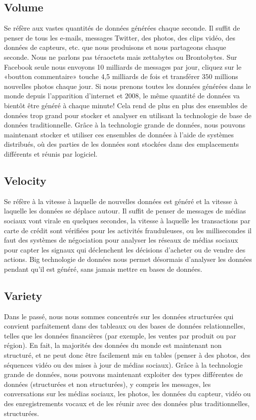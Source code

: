 \documentclass[11pt,twoside,openany,x11names,svgnames]{memoir}
\begin{document}
				\subsection{Volume}
				\normalsize Se réfère aux vastes quantités de données générées chaque seconde. Il suffit de penser de tous les e-mails, messages Twitter, des photos, des clips vidéo, des données de capteurs, etc. que nous produisons et nous partageons chaque seconde. Nous ne parlons pas téraoctets mais zettabytes ou Brontobytes. Sur Facebook seule nous envoyons 10 milliards de messages par jour, cliquez sur le «boutton commentaire» touche 4,5 milliards de fois et transférer $350$ millions nouvelles photos chaque jour. Si nous prenons toutes les données générées dans le monde depuis l'apparition d'internet et $2008$, le même quantité de données va bientôt être généré à chaque minute! Cela rend de plus en plus des ensembles de données trop grand pour stocker et analyser en utilisant la technologie de base de données traditionnelle. Grâce à la technologie grande de données, nous pouvons maintenant stocker et utiliser ces ensembles de données à l'aide de systèmes distribués, où des parties de les données sont stockées dans des emplacements différents et réunis par logiciel.
				\subsection{Velocity}
				\normalsize Se réfère à la vitesse à laquelle de nouvelles données est généré et la vitesse à laquelle les données se déplace autour. Il suffit de penser de messages de médias sociaux vont virale en quelques secondes, la vitesse à laquelle les transactions par carte de crédit sont vérifiées pour les activités frauduleuses, ou les millisecondes il faut des systèmes de négociation pour analyser les réseaux de médias sociaux pour capter les signaux qui déclenchent les décisions d'acheter ou de vendre des actions. Big technologie de données nous permet désormais d'analyser les données pendant qu'il est généré, sans jamais mettre en bases de données.
				\subsection{Variety}
				 \normalsize Dans le passé, nous nous sommes concentrés sur les données structurées qui convient parfaitement dans des tableaux ou des bases de données relationnelles, telles que les données financières (par exemple, les ventes par produit ou par région). En fait, la majorités des données du monde est maintenant non structuré, et ne peut donc être facilement mis en tables (penser à des photos, des séquences vidéo ou des mises à jour de médias sociaux). Grâce à la technologie grande de données, nous pouvons maintenant exploiter des types différentes de données (structurées et non structurées), y compris les messages, les conversations sur les médias sociaux, les photos, les données du capteur, vidéo ou des enregistrements vocaux et de les réunir avec des données plus traditionnelles, structurées.
\end{document}
